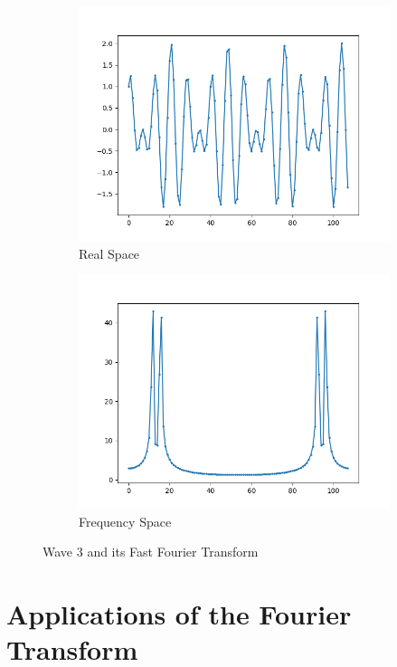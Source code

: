 \documentclass{amsproc}
\begin{document}
\begin{figure}[h]
\centering
\begin{subfigure}{.4\textwidth}
	\centering
	\includegraphics[scale=.3]{images/FFTOriginal3.png}
	\caption{Real Space}
	\label{fig:sub3}
\end{subfigure} %
\begin{subfigure}{.4\textwidth}
	\centering
	\includegraphics[scale=.3]{images/FFTResult3.png}
	\caption{Frequency Space}
	\label{fig:sub4}
\end{subfigure}
\caption{Wave 3 and its Fast Fourier Transform}
\label{fig:text3}
\end{figure}
\section{Applications of the Fourier Transform}
\end{document}
